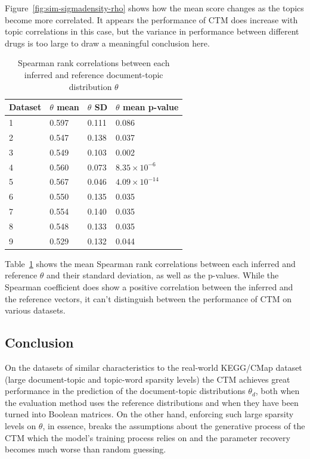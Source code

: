 \documentclass[12pt,a4paper,twoside,openright]{report}
\begin{document}
Figure~\ref{fig:sim-sigmadensity-rho} shows how the mean score changes as the topics become more correlated. It appears the performance of CTM does increase with topic correlations in this case, but the variance in performance between different drugs is too large to draw a meaningful conclusion here.

\begin{table}
\begin{tabular}{| l | l | l | l |}
\hline
Dataset & $\theta$ mean & $\theta$ SD & $\theta$ mean p-value \\
\hline
1 & 0.597 & 0.111 & 0.086\\
2 & 0.547 & 0.138 & 0.037 \\
3 & 0.549 & 0.103 & 0.002 \\
4 & 0.560 & 0.073 & $8.35 \times 10^{-6}$\\
5 & 0.567 & 0.046 & $4.09 \times 10^{-14}$\\
6 & 0.550 & 0.135 & 0.035 \\
7 & 0.554 & 0.140 & 0.035 \\
8 & 0.548 & 0.133 & 0.035\\
9 & 0.529 & 0.132 & 0.044\\
\hline
\end{tabular}
\caption{Spearman rank correlations between each inferred and reference document-topic distribution $\theta$}
\label{tab:sim-spearman-theta}
\end{table}

Table~\ref{tab:sim-spearman-theta} shows the mean Spearman rank correlations between each inferred and reference $\theta$ and their standard deviation, as well as the p-values. While the Spearman coefficient does show a positive correlation between the inferred and the reference vectors, it can't distinguish between the performance of CTM on various datasets.

\subsection{Conclusion}

On the datasets of similar characteristics to the real-world KEGG/CMap dataset (large document-topic and topic-word sparsity levels) the CTM achieves great performance in the prediction of the document-topic distributions $\theta_d$, both when the evaluation method uses the reference distributions and when they have been turned into Boolean matrices. On the other hand, enforcing such large sparsity levels on $\theta$, in essence, breaks the assumptions about the generative process of the CTM which the model's training process relies on and the parameter recovery becomes much worse than random guessing.
\end{document}
